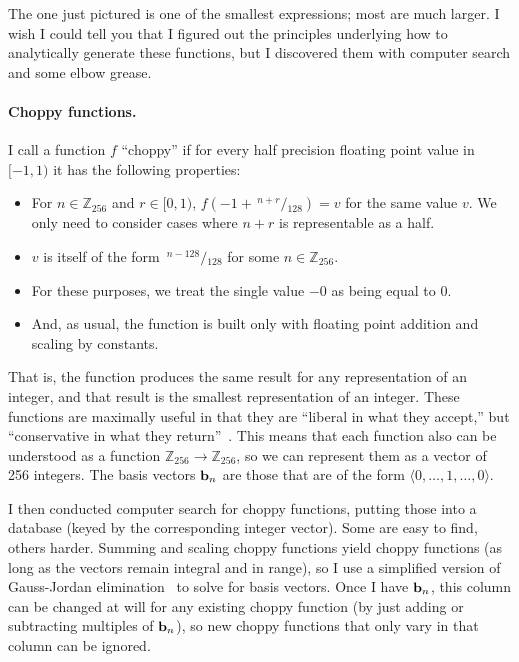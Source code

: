 \documentclass[twocolumn]{article}
\newcommand\sfrac[2]{\!{}\,^{#1}\!/{}\!_{#2}}
\newcommand\basis{\ensuremath{\textrm{\bf b}}}
\begin{document}
The one just pictured is one of the smallest expressions; most are
much larger. I wish I could tell you that I figured out the principles
underlying how to analytically generate these functions, but I
discovered them with computer search and some elbow grease.

\paragraph{Choppy functions.}
I call a function $f$ ``choppy'' if for every half precision floating point value in
$[-1, 1)$ it has the following properties:

\begin{itemize}
\item For $n \in \mathbb{Z}_{256}$ and $r \in [0, 1)$,
  $f(-1 + \sfrac{n + r}{128}) = v$ for the same value $v$. We only need to
  consider cases where $n + r$ is representable as a half.
\item $v$ is itself of the form $\sfrac{n - 128}{128}$ for some $n \in \mathbb{Z}_{256}$.
\item For these purposes, we treat the single value $-0$ as being equal to $0$.
\item And, as usual, the function is built only with floating point addition
  and scaling by constants.
\end{itemize}

That is, the function produces the same result for any representation
of an integer, and that result is the smallest representation of an
integer. These functions are maximally useful in that they are
``liberal in what they accept,'' but ``conservative in what they
return''~\cite{rfc761}. This means that each function also can be
understood as a function $\mathbb{Z}_{256} \rightarrow
\mathbb{Z}_{256}$, so we can represent them as a vector of 256
integers. The basis vectors $\basis_n$ are those that are of the form
$\langle 0, \ldots, 1, \ldots, 0\rangle$.

I then conducted computer search for choppy functions, putting those
into a database (keyed by the corresponding integer vector). Some are
easy to find, others harder. Summing and scaling choppy functions
yield choppy functions (as long as the vectors remain integral and in
range), so I use a simplified version of Gauss-Jordan
elimination~\cite{gaussjordan} to solve for basis vectors. Once I have
$\basis_n$, this column can be changed at will for any existing choppy
function (by just adding or subtracting multiples of $\basis_n$), so
new choppy functions that only vary in that column can be ignored.
\end{document}
